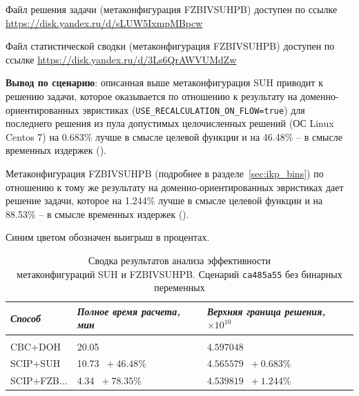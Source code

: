 \documentclass[%
	11pt,
	a4paper,
	utf8,
		]{article}
\begin{document}
Файл решения задачи (метаконфигурация FZBIVSUHPB) доступен по ссылке \url{https://disk.yandex.ru/d/sLUW5IxmpMBpcw}

Файл статистической сводки (метаконфигурация FZBIVSUHPB) доступен по ссылке \url{https://disk.yandex.ru/d/3Ls6QrAWVUMdZw}

\vspace*{3mm}
\textbf{Вывод по сценарию}: описанная выше метаконфигурация SUH приводит к решению задачи, которое оказывается по отношению к результату на доменно-ориентированных эвристиках (\verb|USE_RECALCULATION_ON_FLOW=true|) для последнего решения из пула допустимых целочисленных решений (ОС Linux Centos 7) на 0.683\% лучше в смысле целевой функции и на 46.48\% -- в смысле временных издержек ().

Метаконфигурация FZBIVSUHPB (подробнее в разделе~\ref{sec:ikp_bins}) по отношению к тому же результату на доменно-ориентированных эвристиках дает решение задачи, которое на 1.244\% лучше в смысле целевой функции и на 88.53\% -- в смысле временных издержек ().

Синим цветом обозначен выигрыш в процентах.

{
	\begin{table}[!h]
		\centering
		\caption{Сводка результатов анализа эффективности \\метаконфигураций SUH и FZBIVSUHPB. Сценарий \texttt{ca485a55} без бинарных переменных}
		\begin{tabular}{ p{2.5cm} p{3.3cm} p{3.4cm} }
			\emph{Способ} & \emph{Полное время расчета, мин} & \emph{Верхняя граница решения, $ \times 10^{10} $} \\
			\hline\hline\\[-3.5mm]
			{CBC+DOH} & 20.05 & $ 4.597048 $ \\
			\hline
			SCIP+SUH & 10.73 {\color{blue} $\ +46.48 $\%} & $ 4.565579 $ {\color{blue} $\ +0.683 $\%} \\
			\hline
			SCIP+FZB... & 4.34 {\color{blue} $\ +78.35 $\%} & $ 4.539819 $ {\color{blue} $\ +1.244 $\%} \\
		\end{tabular}\label{tab:ca485a55_wo_bins}
	\end{table}
}
\end{document}
